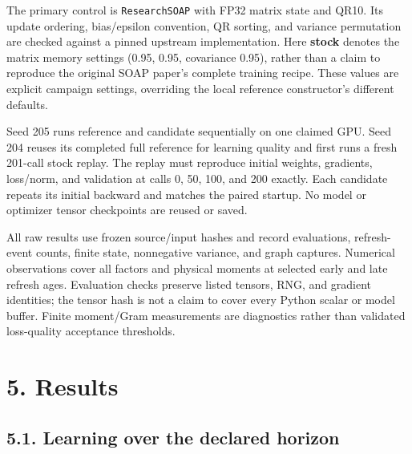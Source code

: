 \documentclass[
  10pt,
]{article}
\begin{document}
The primary control is \texttt{ResearchSOAP} with FP32 matrix state and
QR10. Its update ordering, bias/epsilon convention, QR sorting, and
variance permutation are checked against a pinned upstream
implementation. Here \textbf{stock} denotes the matrix memory settings
(0.95, 0.95, covariance 0.95), rather than a claim to reproduce the
original SOAP paper's complete training recipe. These values are
explicit campaign settings, overriding the local reference constructor's
different defaults.

Seed 205 runs reference and candidate sequentially on one claimed GPU.
Seed 204 reuses its completed full reference for learning quality and
first runs a fresh 201-call stock replay. The replay must reproduce
initial weights, gradients, loss/norm, and validation at calls 0, 50,
100, and 200 exactly. Each candidate repeats its initial backward and
matches the paired startup. No model or optimizer tensor checkpoints are
reused or saved.

All raw results use frozen source/input hashes and record evaluations,
refresh-event counts, finite state, nonnegative variance, and graph
captures. Numerical observations cover all factors and physical moments
at selected early and late refresh ages. Evaluation checks preserve
listed tensors, RNG, and gradient identities; the tensor hash is not a
claim to cover every Python scalar or model buffer. Finite moment/Gram
measurements are diagnostics rather than validated loss-quality
acceptance thresholds.

\hypertarget{results}{%
\section{5. Results}\label{results}}

\hypertarget{learning-over-the-declared-horizon}{%
\subsection{5.1. Learning over the declared
horizon}\label{learning-over-the-declared-horizon}}
\end{document}
